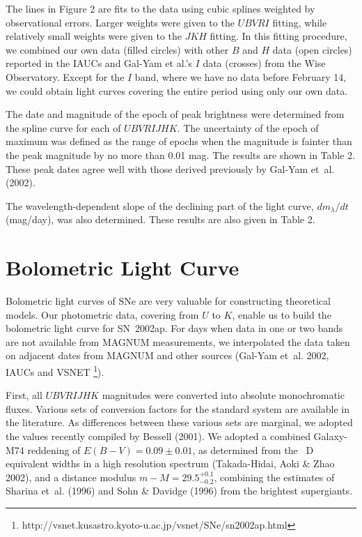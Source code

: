 \documentclass[10pt,preprint2]{aastex}
\begin{document}
The lines in Figure 2 are fits to the data using cubic splines
weighted by observational errors.  Larger weights were given to
the $UBVRI$ fitting, while relatively small weights were given
to the $JKH$ fitting.  In this fitting procedure, we combined
our own data (filled circles) with other $B$ and $H$ data (open
circles) reported in the IAUCs and Gal-Yam et al.'s $I$ data
(crosses) from the Wise Observatory.  Except for the $I$ band,
where we have no data before February 14, we could obtain light
curves covering the entire period using only our own data.

The date and magnitude of the epoch of peak brightness were
determined from the spline curve for each of $UBVRIJHK$.
The uncertainty of the epoch of maximum was defined as the
range of epochs when the magnitude is fainter than the peak
magnitude by no more than 0.01 mag. The results are shown in
Table 2.  These peak dates agree well with those derived
previously by Gal-Yam et~al. (2002).

The wavelength-dependent slope of the declining part of the
light curve, $dm_\lambda/dt$ (mag/day), was also determined.
These results are also given in Table 2.

\section{Bolometric Light Curve}

Bolometric light curves of SNe are very valuable for constructing
theoretical models. Our photometric data, covering from $U$ to
$K$, enable us to build the bolometric light curve for SN~2002ap.
For days when data in one or two bands are not available from
MAGNUM measurements, we interpolated the data taken on adjacent
dates from MAGNUM and other sources (Gal-Yam et~al. 2002, IAUCs
and VSNET
\footnote{http://vsnet.kusastro.kyoto-u.ac.jp/vsnet/SNe/sn2002ap.html}).

First, all $UBVRIJHK$ magnitudes were converted into absolute
monochromatic fluxes.  Various sets of conversion factors for the
standard system are available in the literature.  As differences
between these various sets are marginal, we adopted the values
recently compiled by Bessell (2001). We adopted a combined
Galaxy-M74 reddening of $E(B-V)=0.09\pm 0.01$, as determined
from the ~D equivalent widths in a high resolution
spectrum (Takada-Hidai, Aoki \& Zhao 2002), and a distance modulus
$m-M=29.5_{-0.2}^{+0.1}$, combining the estimates of Sharina et~al.
(1996) and Sohn \& Davidge (1996) from the brightest supergiants.
\end{document}

